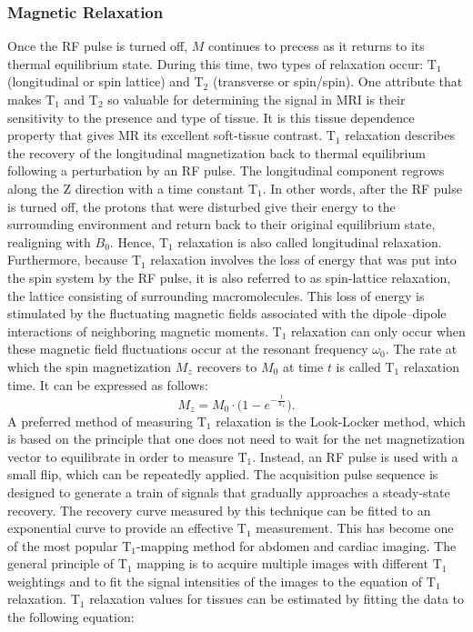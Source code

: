 \subsubsection{Magnetic Relaxation}
Once the RF pulse is turned off, $M$ continues to precess as it returns to its thermal equilibrium state. During this time, two types of relaxation occur: $\text{T}_1$ (longitudinal or spin lattice) and $\text{T}_2$ (transverse or spin/spin). One attribute that makes $\text{T}_1$ and $\text{T}_2$ so valuable for determining the signal in MRI is their sensitivity to the presence and type of tissue. It is this tissue dependence property that gives MR its excellent soft-tissue contrast. $\text{T}_1$ relaxation describes the recovery of the longitudinal magnetization back to thermal equilibrium following a perturbation by an RF pulse. The longitudinal component regrows along the Z direction with a time constant $\text{T}_1$. In other words, after the RF pulse is turned off, the protons that were disturbed give their energy to the surrounding environment and return back to their original equilibrium state, realigning with $B_0$. Hence, $\text{T}_1$ relaxation is also called longitudinal relaxation. Furthermore, because $\text{T}_1$ relaxation involves the loss of energy that was put into the spin system by the RF pulse, it is also referred to as spin-lattice relaxation, the lattice consisting of surrounding macromolecules. This loss of energy is stimulated by the fluctuating magnetic fields associated with the dipole–dipole interactions of neighboring magnetic moments. $\text{T}_1$ relaxation can only occur when these magnetic field fluctuations occur at the resonant frequency $\omega_0$. The rate at which the spin magnetization $M_z$ recovers to $M_0$ at time $t$ is called $\text{T}_1$ relaxation time. It can be expressed as follows:
\begin{equation}
	M_z = M_0 \cdot \bigg(1 - e^{-\frac{t}{\text{T}_1}} \bigg).
\end{equation}
A preferred method of measuring $\text{T}_1$ relaxation is the Look-Locker method, which is based on the principle that one does not need to wait for the net magnetization vector to equilibrate in order to measure $\text{T}_1$. Instead, an RF pulse is used with a small flip, which can be repeatedly applied. The acquisition pulse sequence is designed to generate a train of signals that gradually approaches a steady-state recovery. The recovery curve measured by this technique can be fitted to an exponential curve to provide an effective $\text{T}_1$ measurement. This has become one of the most popular $\text{T}_1$-mapping method for abdomen and cardiac imaging. The general principle of $\text{T}_1$ mapping is to acquire multiple images with different $\text{T}_1$ weightings and to fit the signal intensities of the images to the equation of $\text{T}_1$ relaxation. $\text{T}_1$ relaxation values for tissues can be estimated by fitting the data to the following equation:

